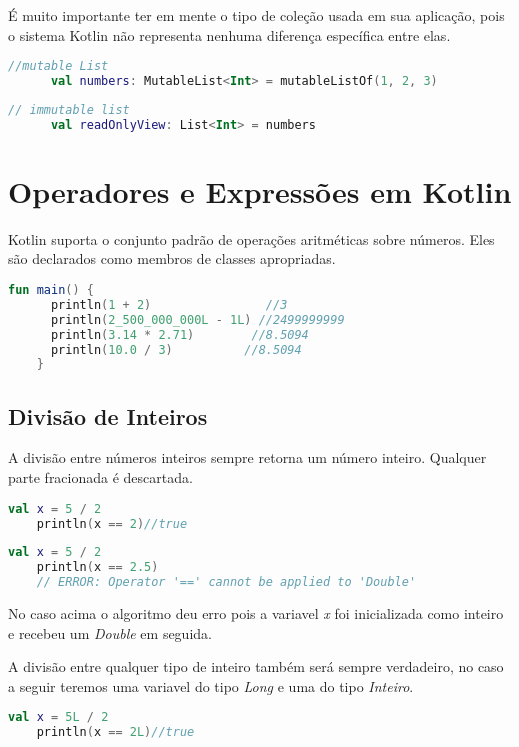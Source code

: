       É muito importante ter em mente o tipo de coleção usada em sua aplicação, pois o sistema Kotlin não representa nenhuma diferença específica entre elas.
      \begin{lstlisting}[label={lst:example1}, language=Kotlin] 
      //mutable List 
      val numbers: MutableList<Int> = mutableListOf(1, 2, 3)
     \end{lstlisting}
      \begin{lstlisting}[label={lst:example1}, language=Kotlin]
      // immutable list
      val readOnlyView: List<Int> = numbers 
        \end{lstlisting}

      \section{Operadores e Express\~{o}es em Kotlin}
    Kotlin suporta o conjunto padrão de operações 
    aritméticas sobre números. Eles são declarados 
    como membros de classes apropriadas.
    \begin{lstlisting}[label={lst:example1}, language=Kotlin]
    fun main() {
      println(1 + 2)                //3
      println(2_500_000_000L - 1L) //2499999999
      println(3.14 * 2.71)        //8.5094
      println(10.0 / 3)          //8.5094
    }
    \end{lstlisting}

    \subsection{Divisão de Inteiros}
    A divisão entre números inteiros sempre 
    retorna um número inteiro. Qualquer 
    parte fracionada é descartada.
    \begin{lstlisting}[label={lst:example1}, language=Kotlin]
    val x = 5 / 2
    println(x == 2)//true
    \end{lstlisting}

    \begin{lstlisting}[label={lst:example1}, language=Kotlin]
    val x = 5 / 2
    println(x == 2.5)  
    // ERROR: Operator '==' cannot be applied to 'Double'
    \end{lstlisting}
    No caso acima o algoritmo deu erro pois a variavel \emph{x} foi inicializada
    como inteiro e recebeu um \emph{Double} em seguida.
    
    A divisão entre qualquer tipo de inteiro também será sempre
    verdadeiro, no caso a seguir teremos uma variavel do tipo \emph{Long} 
    e uma do tipo \emph{Inteiro}.
    \begin{lstlisting}[label={lst:example1}, language=Kotlin]
    val x = 5L / 2
    println(x == 2L)//true
    \end{lstlisting}

